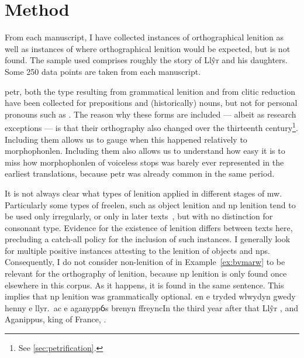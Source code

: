 \section{Method}
\label{sec:method}
From each manuscript, I have collected instances of orthographical
lenition as well as instances of where orthographical lenition would
be expected, but is not found. The sample used comprises roughly the
story of Llŷr and his daughters.  Some 250 data points are taken
from each manuscript.

\Gls{petr}, both the type resulting from grammatical lenition and from clitic reduction have been collected for prepositions
and (historically) nouns, but not for personal pronouns such
as . The reason why these forms are included --- albeit
as research exceptions --- is that their orthography also changed over the
thirteenth century\footnote{See \ref{sec:petrification}.}. Including them allows
us to gauge when this happened relatively to \gls{morphophonlen}.
Including them also allows us to understand how easy it is to miss how \gls{morphophonlen} of voiceless stops was barely ever represented in the earliest translations, because \gls{petr} was already common in the same period.

It is not always clear what types of lenition applied in different
stages of \gls{mw}. Particularly some types of \gls{freelen},
such as object lenition and \gls{np} lenition tend to be used only irregularly,
or only in later texts~\autocite{van_development14}, but
with no distinction for consonant type. Evidence for the existence of
lenition differs between texts here, precluding a catch-all policy for
the inclusion of such instances. I generally look for multiple positive
instances attesting to the lenition of objects and \gls{np}s.
Consequently, I do not consider non-lenition of  in
Example~\ref{ex:bvmarw} to be relevant for the orthography of lenition,
because \gls{np} lenition is only found once elsewhere in this corpus.
As it happens, it is found in the same sentence.
This implies that \gls{np} lenition was grammatically optional.
{en e tryded wlwydyn gwedy henny e  llyr.\ ac e  aganyppỽs brenyn ffreync}{In the third year after that Llŷr , and Aganippus, king of France, .}

